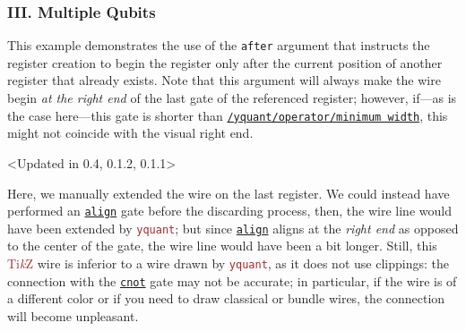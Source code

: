 \documentclass{scrartcl}
\makeatletter
\newenvironment{codeexample*}{%
   \VerbatimEnvironment%
   \let\FVB@VerbatimOut\minted@FVB@VerbatimOut
   \let\FVE@VerbatimOut\minted@FVE@VerbatimOut
   \minted@configlang{tex}%
   \minted@fvset
   \begin{VerbatimOut}[codes={\catcode`\^^I=12},firstline,lastline]{\minted@jobname.pyg}%
}{
   \end{VerbatimOut}%
   \minted@langlinenoson%
   \begin{adjustbox}{center}
       \minted@jobname.pyg %
   \end{adjustbox}\nopagebreak
   \expandafter\minted@pygmentize\expandafter{\minted@lang}%
   \minted@langlinenosoff%
   \par%
}
\def\TikZ{\textcolor{brown}{Ti\textit kZ}}
\def\pkg#1{\textcolor{brown}{\texttt{#1}}}
\def\gate#1{\hyperref[gate:#1]{\texttt{#1}}}
\def\style#1{\hyperref[style:#1]{\texttt{#1}}}
\def\Yquant{\pkg{yquant}}
\makeatother
\begin{document}
         \subsubsection{III. Multiple Qubits}
            \begin{example}
               \begin{codeexample*}
               \end{codeexample*}
               This example demonstrates the use of the \texttt{after} argument that instructs the register creation to begin the register only after the current position of another register that already exists.
               Note that this argument will always make the wire begin \emph{at the right end} of the last gate of the referenced register; however, if---as is the case here---this gate is shorter than \style{/yquant/operator/minimum width}, this might not coincide with the visual right end.
            \end{example}

            \clearpage
            \begin{example}<Updated in 0.4, 0.1.2, 0.1.1>
               \begin{codeexample*}
               \end{codeexample*}
               Here, we manually extended the wire on the last register.
               We could instead have performed an \gate{align} gate before the discarding process, then, the wire line would have been extended by \Yquant{}; but since \gate{align} aligns at the \emph{right end} as opposed to the center of the gate, the wire line would have been a bit longer.
               Still, this \TikZ{} wire is inferior to a wire drawn by \Yquant, as it does not use clippings: the connection with the \gate{cnot} gate may not be accurate; in particular, if the wire is of a different color or if you need to draw classical or bundle wires, the connection will become unpleasant.
            \end{example}
\end{document}
